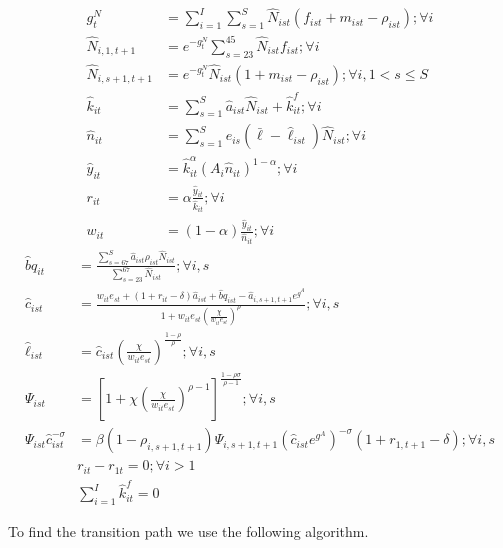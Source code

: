 \documentclass[letterpaper,12pt]{article}
\theoremstyle{definition}
\numberwithin{equation}{section}
\begin{document}
\begin{spacing}{1.5}
	\begin{align}
		g^N_t & = \sum_{i=1}^I \sum_{s=1}^S \hat N_{ist} (f_{ist}+m_{ist}-\rho_{ist}) ; \forall i \label{eq_3gNdef}\\
		\hat N_{i,1,t+1} & = e^{-g^N_t}\sum_{s=23}^{45} \hat N_{ist} f_{ist} ; \forall i\\
		\hat N_{i,s+1,t+1} & = e^{-g^N_t}\hat N_{ist} (1+m_{ist}-\rho_{ist}); \forall i, 1<s\le S \label{eq_3pop2} \\
		\hat k_{it} & = \sum_{s=1}^S \hat a_{ist} \hat N_{ist} + \hat k_{it}^f; \forall i \label{eq_3kdef}\\
		\hat n_{it} & = \sum_{s=1}^S e_{is} (\bar \ell - \hat \ell_{ist}) \hat N_{ist}; \forall i \label{eq_3cond2} \\
		\hat y_{it} & = \hat k_{it}^\alpha \left( A_{i} \hat n_{it} \right)^{1-\alpha} ; \forall i \label{eq_3ydef} \\
		r_{it} & = \alpha \frac{\hat y_{it}}{\hat k_{it}}; \forall i \label{eq_3rdef} \\
		w_{it} & = (1-\alpha) \frac{\hat y_{it}}{\hat n_{it}}; \forall i \label{eq_3wdef}
	\end{align}
	\begin{align}
		\hat bq_{it} & = \frac{\sum_{s=67}^S \hat a_{ist} \rho_{ist} \hat N_{ist}}{\sum_{s=23}^{67} \hat N_{ist}} ; \forall i,s \label{eq_3bqdef} \\
    	\hat c_{ist} & = \frac{w_{it} e_{st} + (1+r_{it}-\delta)\hat a_{ist} + {\hat bq}_{ist} - \hat a_{i,s+1,t+1}e^{g^A}} {1 + w_{it} e_{st} \left(\frac{\chi} {w_{it} e_{st}}\right)^{\rho}}; \forall i,s \label{eq_3cdef2}\\
		\hat \ell_{ist} & = \hat c_{ist} \left(\frac{\chi}{w_{it}e_{st}}\right)^{\frac{1-\rho}{\rho}} ; \forall i,s \label{eq3_elldef}\\
		\Psi_{ist} & = \left[1 + \chi \left(\frac{\chi} {w_{it} e_{st}}\right)^{\rho-1} \right]^{\frac{1-\rho \sigma}{\rho-1}}; \forall i,s \label{eq_3Psidef2} \\
		\Psi_{ist} \hat c_{ist}^{-\sigma} & = \beta (1-\rho_{i,s+1,t+1}) \Psi_{i,s+1,t+1} \left(\hat c_{ist}e^{g^A}\right)^{-\sigma}(1+r_{1,t+1}-\delta); \forall i,s \label{eq_3Euler2} \\
		& r_{it} - r_{1t} = 0; \forall i>1 \label{eq_3requal}\\
		& \sum_{i=1}^I \hat k^f_{it} = 0 \label{eq_3cond3}
	\end{align}

	To find the transition path we use the following algorithm.


\end{spacing}
\end{document}
